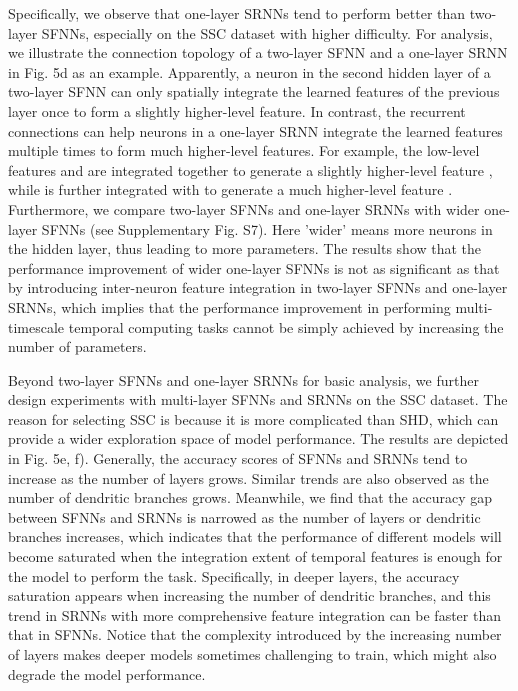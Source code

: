 Specifically, we observe that one-layer SRNNs tend to perform better than two-layer SFNNs, especially on the SSC dataset with higher difficulty. For analysis, we illustrate the connection topology of a two-layer SFNN and a one-layer SRNN in Fig. 5d as an example. Apparently, a neuron in the second hidden layer of a two-layer SFNN can only spatially integrate the learned features of the previous layer once to form a slightly higher-level feature. In contrast, the recurrent connections can help neurons in a one-layer SRNN integrate the learned features multiple times to form much higher-level features. For example, the low-level features 
 and 
 are integrated together to generate a slightly higher-level feature 
, while 
 is further integrated with 
 to generate a much higher-level feature 
. Furthermore, we compare two-layer SFNNs and one-layer SRNNs with wider one-layer SFNNs (see Supplementary Fig. S7). Here ’wider’ means more neurons in the hidden layer, thus leading to more parameters. The results show that the performance improvement of wider one-layer SFNNs is not as significant as that by introducing inter-neuron feature integration in two-layer SFNNs and one-layer SRNNs, which implies that the performance improvement in performing multi-timescale temporal computing tasks cannot be simply achieved by increasing the number of parameters.

Beyond two-layer SFNNs and one-layer SRNNs for basic analysis, we further design experiments with multi-layer SFNNs and SRNNs on the SSC dataset. The reason for selecting SSC is because it is more complicated than SHD, which can provide a wider exploration space of model performance. The results are depicted in Fig. 5e, f). Generally, the accuracy scores of SFNNs and SRNNs tend to increase as the number of layers grows. Similar trends are also observed as the number of dendritic branches grows. Meanwhile, we find that the accuracy gap between SFNNs and SRNNs is narrowed as the number of layers or dendritic branches increases, which indicates that the performance of different models will become saturated when the integration extent of temporal features is enough for the model to perform the task. Specifically, in deeper layers, the accuracy saturation appears when increasing the number of dendritic branches, and this trend in SRNNs with more comprehensive feature integration can be faster than that in SFNNs. Notice that the complexity introduced by the increasing number of layers makes deeper models sometimes challenging to train, which might also degrade the model performance.

